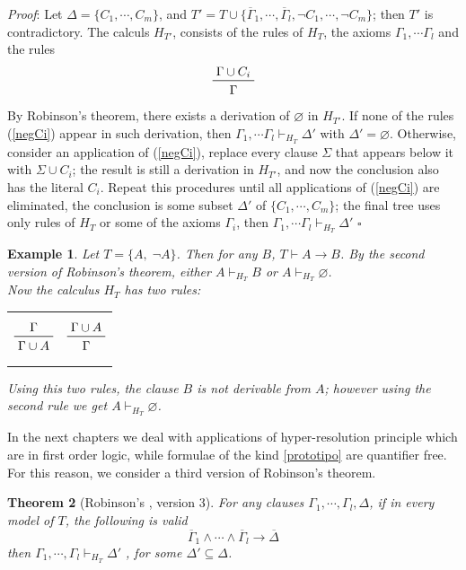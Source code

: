 \documentclass[a4paper,12pt,oneside]{book}
\newtheorem{theorem}{Theorem}[chapter]
\newtheorem{example}[theorem]{Example}
\newcommand*{\QED}{\hfill\ensuremath{\square}}
\let\emptyset\varnothing
\let\e\wedge
\begin{document}
\textit{Proof}: Let $\Delta=\{C_1,\cdots,C_m\}$, and $T'= T\cup\{ \overline{\Gamma}_1, \cdots ,\overline{\Gamma}_l, \neg C_1,\cdots ,\neg C_m\}  $; then $T'$ is contradictory.
The calculs $H_{T'}$, consists of the rules of $H_T$, the axioms $\Gamma_1,\cdots\Gamma_l$ and the rules
\begin{equation}\label{negCi}
\prftree{\Gamma\cup C_i }{\Gamma }
\end{equation}
By Robinson's theorem, there exists a derivation of $\emptyset$ in $H_{T'}$. If none of the rules (\ref{negCi}) appear in such derivation, then $\Gamma_1,\cdots\Gamma_l\vdash_{H_T} \Delta'$ with $\Delta'=\emptyset$. Otherwise, consider an application of (\ref{negCi}), replace every clause $\Sigma$ that appears below it with $\Sigma\cup C_i$; the result is still a derivation in $H_{T'}$, and now the conclusion also has the literal $C_i$. Repeat this procedures until all applications of (\ref{negCi}) are eliminated, the conclusion is some subset $\Delta'$ of 	$\{C_1,\cdots,C_m\}$; the final tree uses only rules of $H_T$ or some of the axioms $\Gamma_i$, then 
$\Gamma_1,\cdots\Gamma_l\vdash_{H_T} \Delta'$
\QED


\begin{example} Let $T=\{ A ,\; \neg A \}$. Then for any $B$, $T\vdash A\rightarrow B$.
By the second version of Robinson's theorem, either $ A \vdash_{H_T} B $ or  $ A \vdash_{H_T} \emptyset$. \\Now the calculus $H_T$ has two rules:

\begin{center}
\begin{tabular}{cc}

$$\prftree{\Gamma }  {\Gamma\cup A} 
$$
& \hspace{10mm}
$$\prftree{\Gamma \cup A }  {\Gamma }
$$
\end{tabular}
\end{center}
Using this two rules, the clause $B$ is not derivable from $A$; however using the second rule we get $ A \vdash_{H_T} \emptyset$.
\end{example}
 

In the next chapters we deal with applications of hyper-resolution principle which are in first order logic, while formulae of the kind \ref{prototipo} are quantifier free. For this reason, we consider a third version of Robinson's theorem. 

\begin{theorem}[{Robinson's , version 3}] \label{Robinson3}
For any clauses $\Gamma_1, \cdots ,\Gamma_l , \Delta$, if in every model of $T$, the following is valid 
\begin{equation}\label{f_rob3}
\overline{\Gamma}_1\e\cdots\e\overline{\Gamma}_l \rightarrow \overline{\Delta}
\end{equation}
then  $\Gamma_1, \cdots ,\Gamma_l \vdash_{H_T} \Delta'$ , for some $\Delta' \subseteq \Delta$.
\end{theorem}
\end{document}
